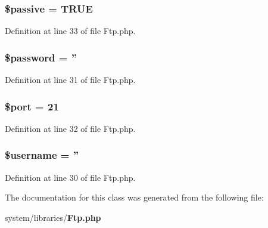 \subsubsection[{\$passive}]{\setlength{\rightskip}{0pt plus 5cm}\$passive = T\-R\-U\-E}\label{class_c_i___f_t_p_a9fb61732ea9189fa2be5574ad3576d9c}


Definition at line 33 of file Ftp.\-php.

\subsubsection[{\$password}]{\setlength{\rightskip}{0pt plus 5cm}\$password = ''}\label{class_c_i___f_t_p_a607686ef9f99ea7c42f4f3dd3dbb2b0d}


Definition at line 31 of file Ftp.\-php.

\subsubsection[{\$port}]{\setlength{\rightskip}{0pt plus 5cm}\$port = 21}\label{class_c_i___f_t_p_aa0787efab4b22e8a212882f3409d4c77}


Definition at line 32 of file Ftp.\-php.

\subsubsection[{\$username}]{\setlength{\rightskip}{0pt plus 5cm}\$username = ''}\label{class_c_i___f_t_p_a0eb82aa5f81cf845de4b36cd653c42cf}


Definition at line 30 of file Ftp.\-php.



The documentation for this class was generated from the following file\-:\begin{DoxyCompactItemize}
\item 
system/libraries/{\bf Ftp.\-php}\end{DoxyCompactItemize}

